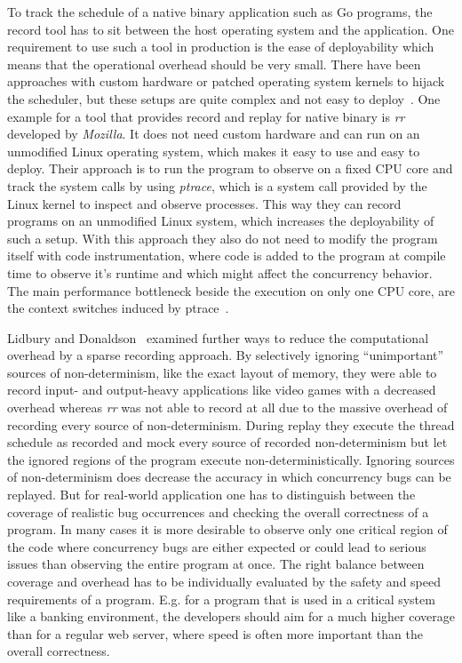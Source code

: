 \documentclass[conference]{IEEEtran}
\begin{document}
To track the schedule of a native binary application such as Go programs, the record tool has to sit between the host operating system and the application.
One requirement to use such a tool in production is the ease of deployability which means that the operational overhead should be very small.
There have been approaches with custom hardware or patched operating system kernels to hijack the scheduler, but these setups are quite complex and not easy to deploy~\cite{o2017engineering}.
One example for a tool that provides record and replay for native binary is \emph{rr}~\cite{mozillarr} developed by \emph{Mozilla}.
It does not need custom hardware and can run on an unmodified Linux operating system, which makes it easy to use and easy to deploy.
Their approach is to run the program to observe on a fixed CPU core and track the system calls by using \emph{ptrace}, which is a system call provided by the Linux kernel to inspect and observe processes.
This way they can record programs on an unmodified Linux system, which increases the deployability of such a setup.
With this approach they also do not need to modify the program itself with code instrumentation, where code is added to the program at compile time to observe it's runtime and which might affect the concurrency behavior.
The main performance bottleneck beside the execution on only one CPU core, are the context switches induced by ptrace~\cite{o2017engineering}.

Lidbury and Donaldson~\cite{lidbury2019sparse} examined further ways to reduce the computational overhead by a sparse recording approach.
By selectively ignoring ``unimportant'' sources of non-determinism, like the exact layout of memory, they were able to record input- and output-heavy applications like video games with a decreased overhead whereas \emph{rr} was not able to record at all due to the massive overhead of recording every source of non-determinism.
During replay they execute the thread schedule as recorded and mock every source of recorded non-determinism but let the ignored regions of the program execute non-deterministically.
Ignoring sources of non-determinism does decrease the accuracy in which concurrency bugs can be replayed.
But for real-world application one has to distinguish between the coverage of realistic bug occurrences and checking the overall correctness of a program.
In many cases it is more desirable to observe only one critical region of the code where concurrency bugs are either expected or could lead to serious issues than observing the entire program at once.
The right balance between coverage and overhead has to be individually evaluated by the safety and speed requirements of a program.
E.g. for a program that is used in a critical system like a banking environment, the developers should aim for a much higher coverage than for a regular web server, where speed is often more important than the overall correctness.
\end{document}
